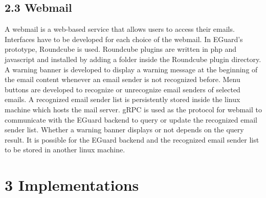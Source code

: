 \documentclass[11pt]{article}
\begin{document}
\subsection*{2.3 \hspace{10pt} Webmail}
A webmail is a web-based service that allows users to access their emails. Interfaces have to be developed for each choice of the webmail. In EGuard's prototype, Roundcube is used. Roundcube plugins are written in php and javascript and installed by adding a folder inside the Roundcube plugin directory. A warning banner is developed to display a warning message at the beginning of the email content whenever an email sender is not recognized before. Menu buttons are developed to recognize or unrecognize email senders of selected emails. A recognized email sender list is persistently stored inside the linux machine which hosts the mail server. gRPC is used as the protocol for webmail to communicate with the EGuard backend to query or update the recognized email sender list. Whether a warning banner displays or not depends on the query result. It is possible for the EGuard backend and the recognized email sender list to be stored in another linux machine.

\section*{\large{3 \hspace{10pt} Implementations}}
\end{document}
